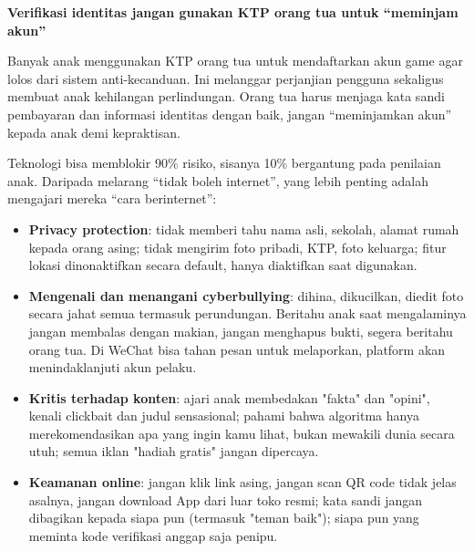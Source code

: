 \textbf{Verifikasi identitas jangan gunakan KTP orang tua untuk “meminjam akun”}\par

Banyak anak menggunakan KTP orang tua untuk mendaftarkan akun game agar lolos dari sistem anti-kecanduan. Ini melanggar perjanjian pengguna sekaligus membuat anak kehilangan perlindungan. Orang tua harus menjaga kata sandi pembayaran dan informasi identitas dengan baik, jangan “meminjamkan akun” kepada anak demi kepraktisan.


Teknologi bisa memblokir 90\% risiko, sisanya 10\% bergantung pada penilaian anak. Daripada melarang “tidak boleh internet”, yang lebih penting adalah mengajari mereka “cara berinternet”:

\begin{itemize}
  \item \textbf{Privacy protection}: tidak memberi tahu nama asli, sekolah, alamat rumah kepada orang asing; tidak mengirim foto pribadi, KTP, foto keluarga; fitur lokasi dinonaktifkan secara default, hanya diaktifkan saat digunakan.
  \item \textbf{Mengenali dan menangani cyberbullying}: dihina, dikucilkan, diedit foto secara jahat semua termasuk perundungan. Beritahu anak saat mengalaminya jangan membalas dengan makian, jangan menghapus bukti, segera beritahu orang tua. Di WeChat bisa tahan pesan untuk melaporkan, platform akan menindaklanjuti akun pelaku.
  \item \textbf{Kritis terhadap konten}: ajari anak membedakan "fakta" dan "opini", kenali clickbait dan judul sensasional; pahami bahwa algoritma hanya merekomendasikan apa yang ingin kamu lihat, bukan mewakili dunia secara utuh; semua iklan "hadiah gratis" jangan dipercaya.
  \item \textbf{Keamanan online}: jangan klik link asing, jangan scan QR code tidak jelas asalnya, jangan download App dari luar toko resmi; kata sandi jangan dibagikan kepada siapa pun (termasuk "teman baik"); siapa pun yang meminta kode verifikasi anggap saja penipu.
\end{itemize}

